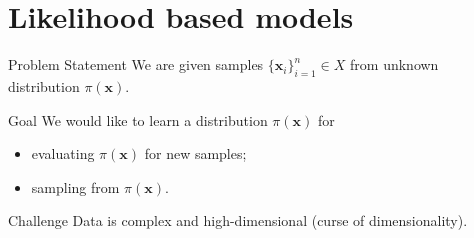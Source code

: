 \documentclass{beamer}
\newcommand{\bx}{\mathbf{x}}
\begin{document}
\section{Likelihood based models}
\begin{frame}{Problem Statement}
We are given samples $\{\bx_i\}_{i=1}^n \in X$ from unknown distribution $\pi(\bx)$.

\begin{block}{Goal}
	We would like to learn a distribution $\pi(\bx)$ for 
	\begin{itemize}
	    \item evaluating $\pi(\bx)$ for new samples;
	    \item sampling from $\pi(\bx)$.
	\end{itemize}
\end{block}
\begin{block}{Challenge}
	 Data is complex and high-dimensional (curse of dimensionality).
\end{block}
\end{frame}
\end{document}
